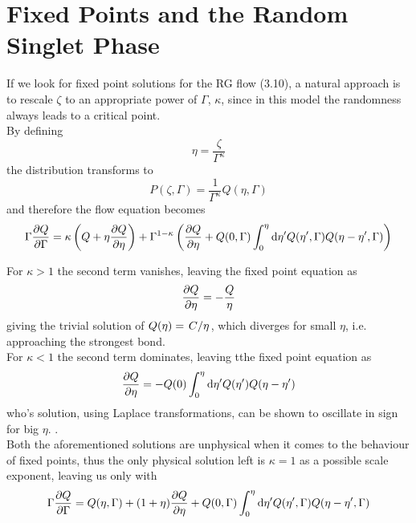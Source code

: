\documentclass[../sdrg,../../main.tex]{subfiles}
\begin{document}
\section{Fixed Points and the Random Singlet Phase}

If we look for fixed point solutions for the RG flow (3.10), a natural approach is to rescale $\zeta$ to an appropriate power of $\Gamma$, $\kappa$, since in this model the randomness always leads to a critical point.\\

By defining
\begin{equation}
    \eta = \frac{\zeta}{\Gamma^\kappa}
\end{equation}
the distribution transforms to
\begin{equation}
    P(\zeta,\Gamma)=\frac{1}{\Gamma^\kappa}Q(\eta,\Gamma)
\end{equation}
and therefore the flow equation becomes
\begin{equation}
    \Gamma\pdv{Q}{\Gamma}=\kappa\left( Q+\eta\pdv{Q}{\eta}\right)+\Gamma^{1-\kappa}\left(\pdv{Q}{\eta}+Q(0,\Gamma)\int_{0}^{\eta}\dd\eta'Q(\eta',\Gamma)Q(\eta-\eta',\Gamma)\right)
\end{equation}

For $\kappa>1$ the second term vanishes, leaving the fixed point equation as
\begin{equation}
    \pdv{Q}{\eta}=-\frac{Q}{\eta}
\end{equation}
giving the trivial solution of $Q(\eta)=\flatfrac{C}{\eta}$, which diverges for small $\eta$, i.e. approaching the strongest bond. \\

For $\kappa<1$ the second term dominates, leaving tthe fixed point equation as
\begin{equation}
    \pdv{Q}{\eta}=-Q(0)\int_{0}^{\eta}\dd\eta'Q(\eta')Q(\eta-\eta')
\end{equation}
who's solution, using Laplace transformations, can be shown to oscillate in sign for big $\eta$. \cite{fernandez}.\\

Both the aforementioned solutions are unphysical when it comes to the behaviour of fixed points, thus the only physical solution left is $\kappa = 1$ as a possible scale exponent, leaving us only with
\begin{equation}
    \Gamma\pdv{Q}{\Gamma}= Q(\eta,\Gamma) + (1+\eta)\pdv{Q}{\eta}+Q(0,\Gamma)\int_{0}^{\eta}\dd \eta'Q(\eta',\Gamma)Q(\eta-\eta',\Gamma)
\end{equation}
\end{document}
